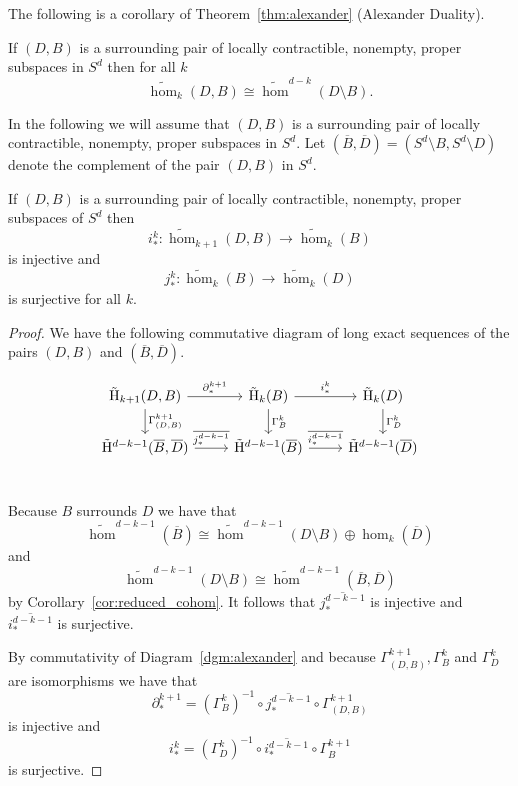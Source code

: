 The following is a corollary of Theorem~\ref{thm:alexander} (Alexander Duality).

\begin{corollary}\label{cor:alexander_surrounds}
  If $(D,B)$ is a surrounding pair of locally contractible, nonempty, proper subspaces in $S^d$ then for all $k$
  \[ \tilde{\hom}_k(D, B) \cong \tilde{\hom}^{d-k}(D\setminus B). \]
\end{corollary}

In the following we will assume that $(D,B)$ is a surrounding pair of locally contractible, nonempty, proper subspaces in $S^d$.
Let $(\overline{B}, \overline{D}) = (S^d\setminus B, S^d\setminus D)$ denote the complement of the pair $(D, B)$ in $S^d$.

\begin{lemma}\label{lem:alexander_comm}
  If $(D,B)$ is a surrounding pair of locally contractible, nonempty, proper subspaces of $S^d$ then
  \[i_*^{k} : \tilde{\hom}_{k+1}(D, B)\to \tilde{\hom}_k(B)\]
  is injective and
  \[j_*^{k} : \tilde{\hom}_{k}(B)\to \tilde{\hom}_k(D)\]
  is surjective for all $k$.
\end{lemma}
\begin{proof}
  We have the following commutative diagram of long exact sequences of the pairs $(D, B)$ and $(\overline{B}, \overline{D})$.

  \begin{equation}\begin{tikzcd}\label{dgm:alexander}
    \tilde{\hom}_{k+1}(D, B)\arrow{r}{\partial_*^{k+1}}\arrow{d}{\Gamma^{k+1}_{(D, B)}} &
    \tilde{\hom}_{k}(B)\arrow{r}{i_*^{k}}\arrow{d}{\Gamma^{k}_B} &
    \tilde{\hom}_{k}(D)\arrow{d}{\Gamma^{k}_D} \\
    \tilde{\hom}^{d-k-1}(\overline{B}, \overline{D})\arrow{r}{\overline{j_*^{d-k-1}}} &
    \tilde{\hom}^{d-k-1}(\overline{B})\arrow{r}{\overline{i_*^{d-k-1}}} &
    \tilde{\hom}^{d-k-1}(\overline{D}) \\
  \end{tikzcd}\end{equation}

  Because $B$ surrounds $D$ we have that
  \[\tilde{\hom}^{d-k-1}(\overline{B}) \cong \tilde{\hom}^{d-k-1}(D\setminus B)\oplus \hom_k(\overline{D})\]
  and
  \[\tilde{\hom}^{d-k-1}(D\setminus B) \cong \tilde{\hom}^{d-k-1}(\overline{B}, \overline{D})\]
  by Corollary~\ref{cor:reduced_cohom}.
  It follows that $\overline{j_*^{d-k-1}}$ is injective and $\overline{i_*^{d-k-1}}$ is surjective.

  By commutativity of Diagram~\ref{dgm:alexander} and because $\Gamma_{(D,B)}^{k+1}, \Gamma_B^k$ and $\Gamma_D^k$ are isomorphisms we have that
  \[\partial_*^{k+1} = (\Gamma_B^{k})^{-1} \circ\overline{j_*^{d-k-1}}\circ \Gamma_{(D,B)}^{k+1}\]
  is injective and
  \[i_*^{k} = (\Gamma_D^{k})^{-1} \circ\overline{i_*^{d-k-1}}\circ \Gamma_B^{k+1}\]
  is surjective.
\end{proof}

